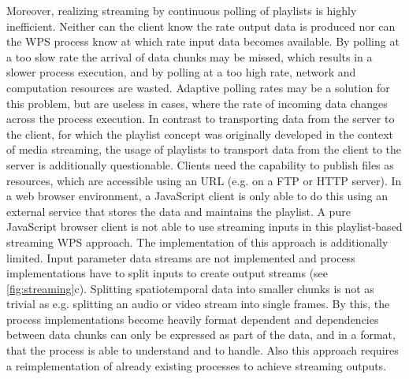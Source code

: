   Moreover, realizing streaming by continuous polling of playlists is highly inefficient. Neither can the client know the rate output data is produced nor can the \ac{WPS} process know at which rate input data becomes available. By polling at a too slow rate the arrival of data chunks may be missed, which results in a slower process execution, and by polling at a too high rate, network and computation resources are wasted. Adaptive polling rates may be a solution for this problem, but are useless in cases, where the rate of incoming data changes across the process execution. In contrast to transporting data from the server to the client, for which the playlist concept was originally developed in the context of media streaming, the usage of playlists to transport data from the client to the server is additionally questionable. Clients need the capability to publish files as resources, which are accessible using an URL (e.g. on a FTP or HTTP server). In a web browser environment, a JavaScript client is only able to do this using an external service that stores the data and maintains the playlist. A pure JavaScript browser client is not able to use streaming inputs in this playlist-based streaming \ac{WPS} approach. The implementation of this approach is additionally limited. Input parameter data streams are not implemented and process implementations have to split inputs to create output streams (see \cref{fig:streaming}c). Splitting spatiotemporal data into smaller chunks is not as trivial as e.g. splitting an audio or video stream into single frames. By this, the process implementations become heavily format dependent and dependencies between data chunks can only be expressed as part of the data, and in a format, that the process is able to understand and to handle. Also this approach requires a reimplementation of already existing processes to achieve streaming outputs.

